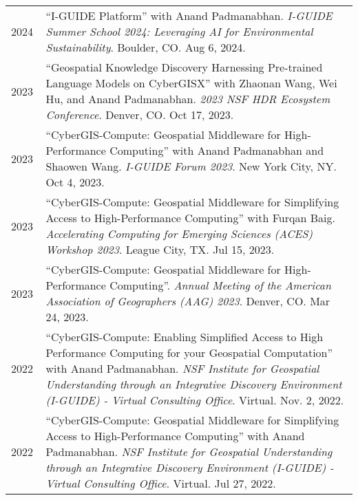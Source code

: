 \documentclass{acmcv}
\begin{document}
    \begin{longtable}{p{0.1\linewidth} p{0.9\linewidth}}

        2024 & ``I-GUIDE Platform'' with Anand Padmanabhan. \textit{I-GUIDE Summer School 2024: Leveraging AI for Environmental Sustainability}. Boulder, CO. Aug 6, 2024.\\


        2023 & ``Geospatial Knowledge Discovery Harnessing Pre-trained Language Models on CyberGISX'' with Zhaonan Wang, Wei Hu, and Anand Padmanabhan. \textit{2023 NSF HDR Ecosystem Conference}. Denver, CO. Oct 17, 2023.\\

        2023 & ``CyberGIS-Compute: Geospatial Middleware for High-Performance Computing'' with Anand Padmanabhan and Shaowen Wang. \textit{I-GUIDE Forum 2023}. New York City, NY. Oct 4, 2023.\\

        2023 & ``CyberGIS-Compute: Geospatial Middleware for Simplifying Access to High-Performance Computing'' with Furqan Baig. \textit{Accelerating Computing for Emerging Sciences (ACES) Workshop 2023}. League City, TX. Jul 15, 2023.\\

        2023 & ``CyberGIS-Compute: Geospatial Middleware for High-Performance Computing''. \textit{Annual Meeting of the American Association of Geographers (AAG) 2023}. Denver, CO. Mar 24, 2023.\\

        2022 & ``CyberGIS-Compute: Enabling Simplified Access to High Performance Computing for your Geospatial Computation'' with Anand Padmanabhan. \textit{NSF Institute for Geospatial Understanding through an Integrative Discovery Environment (I-GUIDE) - Virtual Consulting Office}. Virtual. Nov. 2, 2022.\\

        2022 & ``CyberGIS-Compute: Geospatial Middleware for Simplifying Access to High-Performance Computing'' with Anand Padmanabhan. \textit{NSF Institute for Geospatial Understanding through an Integrative Discovery Environment (I-GUIDE) - Virtual Consulting Office}. Virtual. Jul 27, 2022. \\

    \end{longtable}

\end{document}
